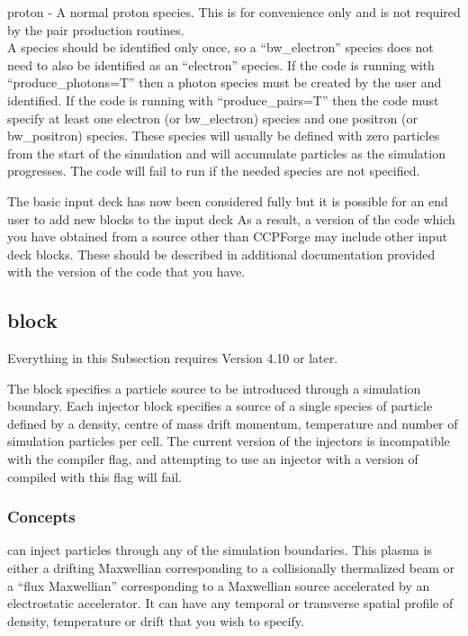 {\emphtext proton} - A normal proton species. This is for convenience only and
  is not required by the pair production routines.\\

A species should be identified only once, so a ``bw\_electron'' species does
not need to also be identified as an ``electron'' species. If the code is
running with ``produce\_photons=T'' then a photon species must be created by
the user and identified. If the code is running with ``produce\_pairs=T'' then
the code must specify at least one electron (or bw\_electron) species and one
positron (or bw\_positron) species. These species will usually be defined with
zero particles from the start of the simulation and will accumulate particles
as the simulation progresses. The code will fail to run if the needed
species are not specified.

The basic input deck has now been considered fully but it
 is possible for an end user to add new blocks to the input deck As a result,
a version of the code which you have obtained from a source other than
CCPForge may include other input deck blocks. These should be described in
additional documentation provided with the version of the code that you have.

\subsection{\texorpdfstring
  { block}
  {           {injector} block}}
\label{sec:injector_block}

{\emphtext
Everything in this Subsection requires {\EPOCH} Version 4.10 or later.}

The  block specifies a particle source to be introduced
through a simulation boundary. Each injector block specifies a source of a
single species of particle defined by a density, centre of mass drift momentum,
temperature and number of simulation particles per cell. The current version
of the injectors is incompatible with the 
compiler flag, and attempting to use an injector with a version of {\EPOCH}
compiled with this flag will fail.

\subsubsection{Concepts}

{\EPOCH} can inject particles through any of the simulation boundaries. This
plasma is either a drifting Maxwellian corresponding to a collisionally
thermalized beam or a ``flux Maxwellian'' corresponding to a Maxwellian source
accelerated by an electrostatic accelerator. It can have any temporal or
transverse spatial profile of density, temperature or drift that you wish to
specify.

